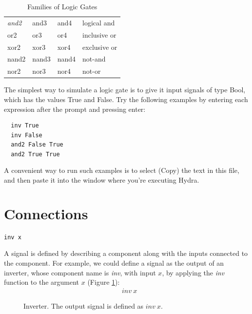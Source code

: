 \documentclass[a4paper,openany,fleqn]{book}
\begin{document}
\begin{table}[htbp]
\begin{center}
\caption{Families of Logic Gates}
\label{tab:n-input-gates}
\begin{tabular}[c]{llll}
\textit{and2}  & and3  & and4  & logical and \\
or2   & or3   & or4   & inclusive or \\
xor2  & xor3  & xor4  & exclusive or \\
nand2 & nand3 & nand4 & not-and \\
nor2  & nor3  & nor4  & not-or
\end{tabular}
\end{center}
\end{table}

The simplest way to simulate a logic gate is to give it input signals
of type Bool, which has the values True and False.  Try the following
examples by entering each expression after the prompt and pressing
enter:

\begin{verbatim}
  inv True
  inv False
  and2 False True
  and2 True True
\end{verbatim}

A convenient way to run such examples is to select (Copy) the text in
this file, and then paste it into the window where you're executing
Hydra.

\section{Connections}
\label{sec:connections}

\begin{minipage}{2cm}
\begin{verbatim}
inv x
\end{verbatim}
\end{minipage}

A signal is defined by describing a component along with the inputs
connected to the component.  For example, we could define a signal as
the output of an inverter, whose component name is \textit{inv}, with
input $x$, by applying the \textit{inv} function to the argument $x$
(Figure \ref{fig:inv}):
\begin{align*}
& \mathit{inv}\ x
\end{align*}

\begin{figure}[htbp]
  \begin{center}
    \hspace{1cm}
    \caption{Inverter.  The output signal is defined as $\mathit{inv}\
      x$.}
    \label{fig:inv}
  \end{center}
\end{figure}
\end{document}
